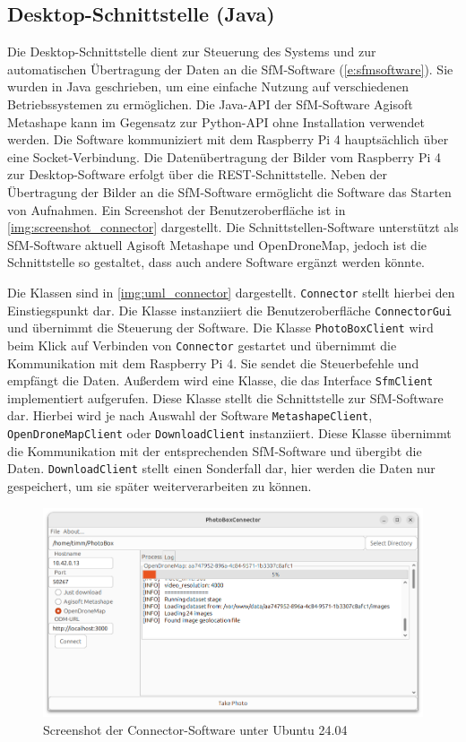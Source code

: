 \documentclass[./00PhotoBox.tex]{subfiles}
\begin{document}
\subsection{Desktop-Schnittstelle (Java)}
Die Desktop-Schnittstelle dient zur Steuerung des Systems und zur automatischen Über\-tragung der Daten an die SfM-Software (\autoref{e:sfmsoftware}). Sie wurden in Java geschrieben, um eine einfache Nutzung auf verschiedenen Betriebssystemen zu ermöglichen. Die Java-API der SfM-Software Agisoft Metashape kann im Gegensatz zur Python-API ohne Installation verwendet werden. Die Software kommuniziert mit dem Raspberry Pi 4 hauptsächlich über eine Socket-Verbindung. Die Datenübertragung der Bilder vom Raspberry Pi 4 zur Desktop-Software erfolgt über die REST-Schnittstelle. Neben der Übertragung der Bilder an die SfM-Software ermöglicht die Software das Starten von Aufnahmen. Ein Screenshot der Benutzeroberfläche ist in \autoref{img:screenshot_connector} dargestellt. Die Schnittstellen-Software unterstützt als SfM-Software aktuell Agisoft Metashape und OpenDroneMap, jedoch ist die Schnittstelle so gestaltet, dass auch andere Software ergänzt werden könnte.

Die Klassen sind in \autoref{img:uml_connector} dargestellt. \texttt{Connector} stellt hierbei den Einstiegspunkt dar. Die Klasse instanziiert die Benutzeroberfläche \texttt{ConnectorGui} und übernimmt die Steuerung der Software. Die Klasse \texttt{PhotoBoxClient} wird beim Klick auf Verbinden von \texttt{Connector} gestartet und übernimmt die Kommunikation mit dem Raspberry Pi 4. Sie sendet die Steuerbefehle und empfängt die Daten. Außerdem wird eine Klasse, die das Interface \texttt{SfmClient} implementiert aufgerufen. Diese Klasse stellt die Schnittstelle zur SfM-Software dar. Hierbei wird je nach Auswahl der Software \texttt{MetashapeClient}, \texttt{OpenDroneMapClient} oder \texttt{DownloadClient} instanziiert. Diese Klasse übernimmt die Kommunikation mit der entsprechenden SfM-Software und übergibt die Daten. \texttt{DownloadClient} stellt einen Sonderfall dar, hier werden die Daten nur gespeichert, um sie später weiterverarbeiten zu können.

\begin{figure}
  \centering
  \includegraphics[width=1\textwidth]{./img/connector_screenshot.png}
  \caption{Screenshot der Connector-Software unter Ubuntu 24.04} %
  \label{img:screenshot_connector} %
\end{figure}
\end{document}
